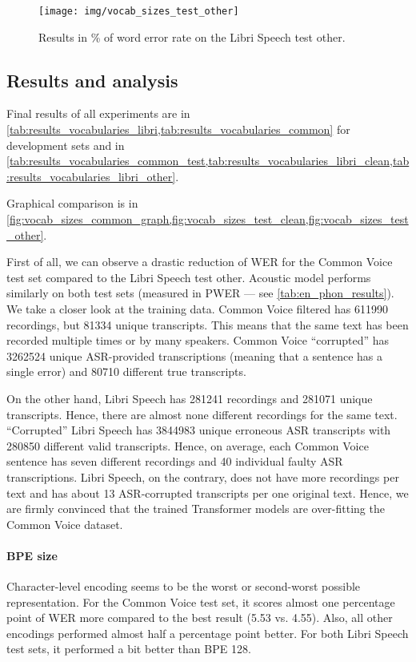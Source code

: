\begin{figure}[p]
	\centering
	\texttt{[image: img/vocab\_sizes\_test\_other]}
	\caption{Results in \% of word error rate on the Libri Speech test other.}
	\label{fig:vocab_sizes_test_other}
\end{figure}



\subsection{Results and analysis}

Final results of all experiments are in \cref{tab:results_vocabularies_libri,tab:results_vocabularies_common} for development sets and in \cref{tab:results_vocabularies_common_test,tab:results_vocabularies_libri_clean,tab:results_vocabularies_libri_other}.

Graphical comparison is in \cref{fig:vocab_sizes_common_graph,fig:vocab_sizes_test_clean,fig:vocab_sizes_test_other}.

First of all, we can observe a drastic reduction of WER for the Common Voice test set compared to the Libri Speech test other. Acoustic model performs similarly on both test sets (measured in PWER --- see \cref{tab:en_phon_results}). We take a closer look at the training data. Common Voice filtered has 611990 recordings, but 81334 unique transcripts. This means that the same text has been recorded multiple times or by many speakers. Common Voice ``corrupted'' has 3262524 unique ASR-provided transcriptions (meaning that a sentence has a single error) and 80710 different true transcripts.

On the other hand, Libri Speech has 281241 recordings and 281071 unique transcripts. Hence, there are almost none different recordings for the same text. ``Corrupted'' Libri Speech has 3844983 unique erroneous ASR transcripts with 280850 different valid transcripts. Hence, on average, each Common Voice sentence has seven different recordings and 40 individual faulty ASR transcriptions. Libri Speech, on the contrary, does not have more recordings per text and has about 13 ASR-corrupted transcripts per one original text. Hence, we are firmly convinced that the trained Transformer models are over-fitting the Common Voice dataset.

\paragraph{BPE size}
Character-level encoding seems to be the worst or second-worst possible representation. For the Common Voice test set, it scores almost one percentage point of WER more compared to the best result (5.53 vs. 4.55). Also, all other encodings performed almost half a percentage point better. For both Libri Speech test sets, it performed a bit better than BPE 128. 

